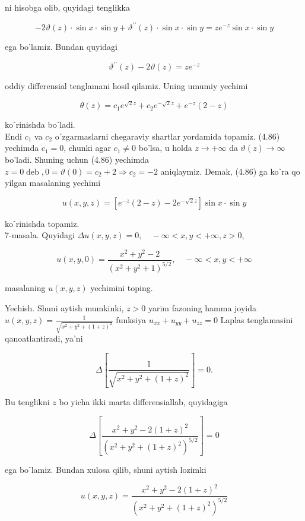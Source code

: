 \documentclass[10pt]{article}
\begin{document}
ni hisobga olib, quyidagi tenglikka

$$
-2 \vartheta(z) \cdot \sin x \cdot \sin y+\vartheta^{\prime \prime}(z) \cdot \sin x \cdot \sin y=z e^{-z} \sin x \cdot \sin y
$$

ega bo'lamiz. Bundan quyidagi

$$
\vartheta^{\prime \prime}(z)-2 \vartheta(z)=z e^{-z}
$$

oddiy differensial tenglamani hosil qilamiz. Uning umumiy yechimi


\begin{equation*}
\theta(z)=c_{1} e^{\sqrt{2} z}+c_{2} e^{-\sqrt{2} z}+e^{-z}(2-z) \tag{4.86}
\end{equation*}


koˋrinishda boˋladi.\\
Endi $c_{1}$ va $c_{2}$ oˋzgarmaslarni chegaraviy shartlar yordamida topamiz. (4.86) yechimda $c_{1}=0$, chunki agar $c_{1} \neq 0$ bo'lsa, u holda $z \rightarrow+\infty$ da $\vartheta(z) \rightarrow \infty$ bo'ladi. Shuning uchun (4.86) yechimda $z=0 \operatorname{deb}, 0=\vartheta(0)=c_{2}+2 \Rightarrow c_{2}=-2$ aniqlaymiz. Demak, (4.86) ga koˋra qo yilgan masalaning yechimi

$$
u(x, y, z)=\left[e^{-z}(2-z)-2 e^{-\sqrt{2} z}\right] \sin x \cdot \sin y
$$

koˋrinishda topamiz.\\
7-masala. Quyidagi $\Delta u(x, y, z)=0, \quad-\infty<x, y<+\infty, z>0$,

$$
u(x, y, 0)=\frac{x^{2}+y^{2}-2}{\left(x^{2}+y^{2}+1\right)^{5 / 2}}, \quad-\infty<x, y<+\infty
$$

masalaning $u(x, y, z)$ yechimini toping.

Yechish. Shuni aytish mumkinki, $z>0$ yarim fazoning hamma joyida $u(x, y, z)=\frac{1}{\sqrt{x^{2}+y^{2}+(1+z)^{2}}}$ funksiya $u_{x x}+u_{y y}+u_{z z}=0$ Laplas tenglamasini qanoatlantiradi, ya'ni

$$
\Delta\left[\frac{1}{\sqrt{x^{2}+y^{2}+(1+z)^{2}}}\right]=0 .
$$

Bu tenglikni $z$ bo yicha ikki marta differensiallab, quyidagiga


\begin{equation*}
\Delta\left[\frac{x^{2}+y^{2}-2(1+z)^{2}}{\left(x^{2}+y^{2}+(1+z)^{2}\right)^{5 / 2}}\right]=0 \tag{4.87}
\end{equation*}


ega boˋlamiz. Bundan xulosa qilib, shuni aytish lozimki


\begin{equation*}
u(x, y, z)=\frac{x^{2}+y^{2}-2(1+z)^{2}}{\left(x^{2}+y^{2}+(1+z)^{2}\right)^{5 / 2}} \tag{4.88}
\end{equation*}
\end{document}
